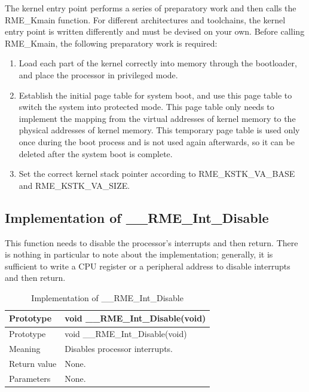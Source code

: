 The kernel entry point performs a series of preparatory work and then calls the RME\_Kmain function. For different architectures and toolchains, the kernel entry point is written differently and must be devised on your own. Before calling RME\_Kmain, the following preparatory work is required:

\begin{enumerate}
\def\labelenumi{\arabic{enumi}.}
\item
  Load each part of the kernel correctly into memory through the bootloader, and place the processor in privileged mode.
\item
  Establish the initial page table for system boot, and use this page table to switch the system into protected mode. This page table only needs to implement the mapping from the virtual addresses of kernel memory to the physical addresses of kernel memory. This temporary page table is used only once during the boot process and is not used again afterwards, so it can be deleted after the system boot is complete.
\item
  Set the correct kernel stack pointer according to RME\_KSTK\_VA\_BASE and RME\_KSTK\_VA\_SIZE.
\end{enumerate}

\subsection{Implementation of \_\_RME\_Int\_Disable}\label{subsec:7-rme-int-disable-implementation}

This function needs to disable the processor's interrupts and then return. There is nothing in particular to note about the implementation; generally, it is sufficient to write a CPU register or a peripheral address to disable interrupts and then return.

\begin{xltabular}{\textwidth}{@{}>{\hsize\raggedright\arraybackslash}X>{\hsize\raggedright\arraybackslash}X@{}}
\caption{Implementation of \_\_RME\_Int\_Disable}\label{tab:7-16-rme-int-disable-implementation}\\
\toprule
Prototype & void \_\_RME\_Int\_Disable(void)\tabularnewline
\endfirsthead
\toprule
Prototype & void \_\_RME\_Int\_Disable(void)\tabularnewline
\midrule
\endhead
\bottomrule
\endlastfoot
Meaning & Disables processor interrupts.\tabularnewline
Return value & None.\tabularnewline
Parameters & None.\tabularnewline
\end{xltabular}
\nopagebreak[4]


